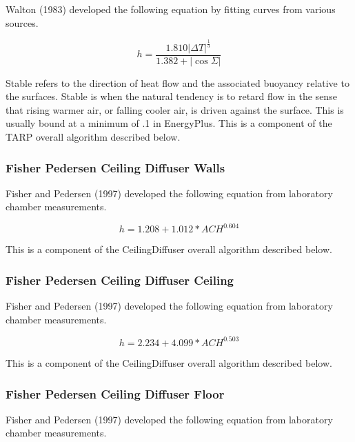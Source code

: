 Walton (1983) developed the following equation by fitting curves from various sources.

\begin{equation}
h = \frac{{1.810{{\left| {\Delta T} \right|}^{\frac{1}{3}}}}}{{1.382 + \left| {\cos \Sigma } \right|}}
\end{equation}

Stable refers to the direction of heat flow and the associated buoyancy relative to the surfaces. Stable is when the natural tendency is to retard flow in the sense that rising warmer air, or falling cooler air, is driven against the surface. This is usually bound at a minimum of .1 in EnergyPlus. This is a component of the TARP overall algorithm described below.

\subsubsection{Fisher Pedersen Ceiling Diffuser Walls}\label{fisher-pedersen-ceiling-diffuser-walls}

Fisher and Pedersen (1997) developed the following equation from laboratory chamber measurements.

\begin{equation}
h = 1.208 + 1.012 * AC{H^{0.604}}
\end{equation}

This is a component of the CeilingDiffuser overall algorithm described below.

\subsubsection{Fisher Pedersen Ceiling Diffuser Ceiling}\label{fisher-pedersen-ceiling-diffuser-ceiling}

Fisher and Pedersen (1997) developed the following equation from laboratory chamber measurements.

\begin{equation}
h = 2.234 + 4.099 * AC{H^{0.503}}
\end{equation}

This is a component of the CeilingDiffuser overall algorithm described below.

\subsubsection{Fisher Pedersen Ceiling Diffuser Floor}\label{fisher-pedersen-ceiling-diffuser-floor}

Fisher and Pedersen (1997) developed the following equation from laboratory chamber measurements.

